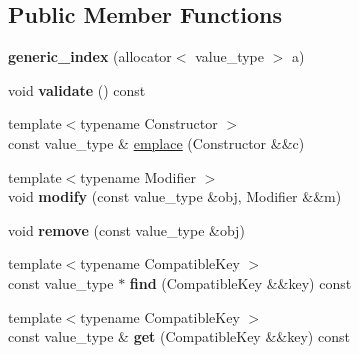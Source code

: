 \subsection*{Public Member Functions}
\begin{DoxyCompactItemize}
\item 
\mbox{\label{classchainbase_1_1generic__index_ace21b09204e84097148ca0e327e5a061}} 
{\bfseries generic\+\_\+index} (allocator$<$ value\+\_\+type $>$ a)
\item 
\mbox{\label{classchainbase_1_1generic__index_a0c1e56f624fd643e0cbd01fc76e27016}} 
void {\bfseries validate} () const
\item 
{\footnotesize template$<$typename Constructor $>$ }\\const value\+\_\+type \& \mbox{\hyperlink{classchainbase_1_1generic__index_aac56dbf8418aa149530d66758c53cf34}{emplace}} (Constructor \&\&c)
\item 
\mbox{\label{classchainbase_1_1generic__index_a23ee7d396d93912e8b925acefd38e277}} 
{\footnotesize template$<$typename Modifier $>$ }\\void {\bfseries modify} (const value\+\_\+type \&obj, Modifier \&\&m)
\item 
\mbox{\label{classchainbase_1_1generic__index_a995b28327dc021e3951512f638dd383f}} 
void {\bfseries remove} (const value\+\_\+type \&obj)
\item 
\mbox{\label{classchainbase_1_1generic__index_a22de8812e62cf6928b88fd5ed0f21155}} 
{\footnotesize template$<$typename Compatible\+Key $>$ }\\const value\+\_\+type $\ast$ {\bfseries find} (Compatible\+Key \&\&key) const
\item 
\mbox{\label{classchainbase_1_1generic__index_aff76c7774e843b31275b1a5d2b27ad30}} 
{\footnotesize template$<$typename Compatible\+Key $>$ }\\const value\+\_\+type \& {\bfseries get} (Compatible\+Key \&\&key) const
\item 
\mbox{\label{classchainbase_1_1generic__index_ab6512360ffe805473165ab1a32ab2d8c}} 

\end{DoxyCompactItemize}
